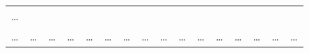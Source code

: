 \documentclass[
]{article}
\begin{document}
\begin{longtable}[]{@{}llllllllllllllll@{}}
\begin{minipage}[t]{0.02\columnwidth}
\ldots{}\strut
\end{minipage}\tabularnewline
\begin{minipage}[t]{0.04\columnwidth}\raggedright
\ldots{}\strut
\end{minipage} & \begin{minipage}[t]{0.04\columnwidth}\raggedright
\ldots{}\strut
\end{minipage} & \begin{minipage}[t]{0.04\columnwidth}\raggedright
\ldots{}\strut
\end{minipage} & \begin{minipage}[t]{0.04\columnwidth}\raggedright
\ldots{}\strut
\end{minipage} & \begin{minipage}[t]{0.04\columnwidth}\raggedright
\ldots{}\strut
\end{minipage} & \begin{minipage}[t]{0.04\columnwidth}\raggedright
\ldots{}\strut
\end{minipage} & \begin{minipage}[t]{0.04\columnwidth}\raggedright
\ldots{}\strut
\end{minipage} & \begin{minipage}[t]{0.04\columnwidth}\raggedright
\ldots{}\strut
\end{minipage} & \begin{minipage}[t]{0.04\columnwidth}\raggedright
\ldots{}\strut
\end{minipage} & \begin{minipage}[t]{0.04\columnwidth}\raggedright
\ldots{}\strut
\end{minipage} & \begin{minipage}[t]{0.03\columnwidth}\raggedright
\ldots{}\strut
\end{minipage} & \begin{minipage}[t]{0.04\columnwidth}\raggedright
\ldots{}\strut
\end{minipage} & \begin{minipage}[t]{0.04\columnwidth}\raggedright
\ldots{}\strut
\end{minipage} & \begin{minipage}[t]{0.04\columnwidth}\raggedright
\ldots{}\strut
\end{minipage} & \begin{minipage}[t]{0.04\columnwidth}\raggedright
\ldots{}\strut
\end{minipage} & \begin{minipage}[t]{0.02\columnwidth}\raggedright
\ldots{}\strut
\end{minipage}\tabularnewline
\bottomrule
\end{longtable}
\end{document}
